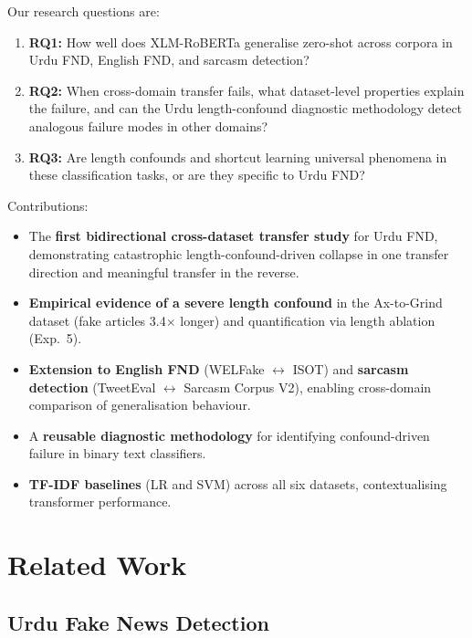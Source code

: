 \documentclass[conference]{IEEEtran}
\begin{document}
Our research questions are:
\begin{enumerate}
    \item \textbf{RQ1:} How well does XLM-RoBERTa generalise
    zero-shot across corpora in Urdu FND, English FND, and
    sarcasm detection?
    \item \textbf{RQ2:} When cross-domain transfer fails, what
    dataset-level properties explain the failure, and can the Urdu
    length-confound diagnostic methodology detect analogous failure
    modes in other domains?
    \item \textbf{RQ3:} Are length confounds and shortcut learning
    universal phenomena in these classification tasks, or are they
    specific to Urdu FND?
\end{enumerate}

\noindent Contributions:
\begin{itemize}
    \item The \textbf{first bidirectional cross-dataset transfer study}
    for Urdu FND, demonstrating catastrophic length-confound-driven
    collapse in one transfer direction and meaningful transfer in the
    reverse.
    \item \textbf{Empirical evidence of a severe length confound}
    in the Ax-to-Grind dataset (fake articles 3.4$\times$ longer)
    and quantification via length ablation (Exp.~5).
    \item \textbf{Extension to English FND} (WELFake
    $\leftrightarrow$ ISOT) and \textbf{sarcasm detection}
    (TweetEval $\leftrightarrow$ Sarcasm Corpus V2), enabling
    cross-domain comparison of generalisation behaviour.
    \item A \textbf{reusable diagnostic methodology} for identifying
    confound-driven failure in binary text classifiers.
    \item \textbf{TF-IDF baselines} (LR and SVM) across all six
    datasets, contextualising transformer performance.
\end{itemize}

\section{Related Work}
\label{sec:related}

\subsection{Urdu Fake News Detection}
\end{document}
